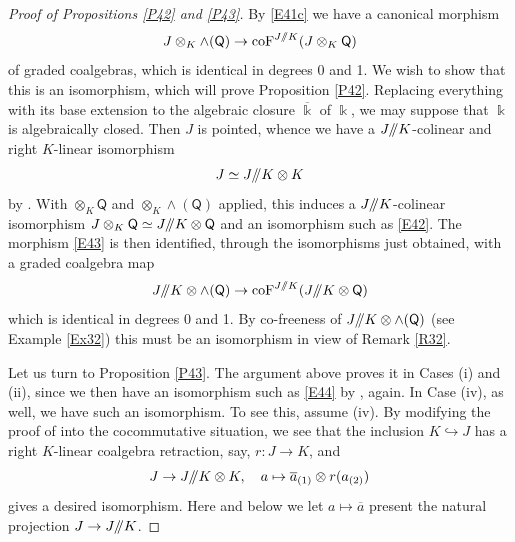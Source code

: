 \documentclass[11pt, a4paper]{amsart}
\theoremstyle{definition}
\numberwithin{equation}{section}
\begin{document}
\begin{proof}[Proof of Propositions \ref{P42} and \ref{P43}]
By \eqref{E41c}
we have a canonical morphism
\begin{equation}\label{E43}
J \otimes_{K} \wedge(\mathsf{Q}) \to \mathrm{coF}^{J/\hspace{-1mm}/K}(J \otimes_{K} \mathsf{Q})
\end{equation}
of graded coalgebras, which is identical in degrees 0 and 1.
We wish to show that this is an isomorphism, which will prove Proposition \ref{P42}.
Replacing everything with its base extension to the algebraic closure $\overline{\Bbbk}$ of $\Bbbk$, 
we may suppose that $\Bbbk$ is algebraically closed.
Then $J$ is pointed, whence we have a $J/\hspace{-1mm}/K$-colinear and right $K$-linear isomorphism
\begin{equation}\label{E44}
J \simeq J/\hspace{-1mm}/K \otimes K 
\end{equation}
by \cite[Theorem 1.3 (4)]{M}. 
With $\otimes_K\mathsf{Q}$ and $\otimes_K \! \wedge\! (\mathsf{Q})$ applied, this induces
a $J/\hspace{-1mm}/K$-colinear isomorphism 
$J \otimes_{K} \mathsf{Q}\simeq J/\hspace{-1mm}/K \otimes \mathsf{Q}$ and an isomorphism
such as \eqref{E42}.
The morphism \eqref{E43} is then identified, through the isomorphisms just obtained, with a graded coalgebra map
\[ J/\hspace{-1mm}/K \otimes \wedge(\mathsf{Q}) \to \mathrm{coF}^{J/\hspace{-1mm}/K}(J/\hspace{-1mm}/K \otimes \mathsf{Q}) \]
which is identical in degrees 0 and 1.
By co-freeness of $J/\hspace{-1mm}/K \otimes \wedge(\mathsf{Q})$ (see Example \ref{Ex32})
this must be an isomorphism in view of Remark \ref{R32}. 

Let us turn to Proposition \ref{P43}. 
The argument above proves it in Cases (i) and (ii), since we then have an isomorphism such as 
\eqref{E44} by \cite[Theorem 1.3 (4)]{M}, again.
In Case (iv), as well, we have such an isomorphism. To see this, assume (iv). 
By modifying the proof of \cite[Theorem 4.1, Lemma 4.2]{M1} into the cocommutative situation, we
see that the inclusion $K \hookrightarrow J$ has a right $K$-linear coalgebra retraction, say, $r : J \to K$,
and
\[ J \to J/\hspace{-1mm}/K \otimes K,\quad a \mapsto \overline{a}_{(1)} \otimes r(a_{(2)}) \]
gives a desired isomorphism. Here and below we let $a \mapsto \overline{a}$ present 
the natural projection $J \to J/\hspace{-1mm}/K$.


\end{proof}
\end{document}

